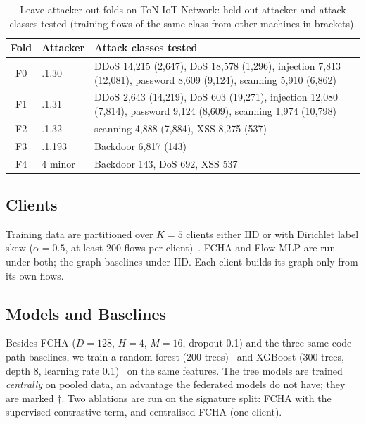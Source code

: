 \documentclass[journal]{IEEEtran}
\begin{document}
\begin{table}[t]
\centering
\caption{Leave-attacker-out folds on ToN-IoT-Network: held-out attacker and attack classes tested (training flows of the same class from other machines in brackets).}
\label{tab:attackerfolds}
\setlength{\tabcolsep}{3pt}
\footnotesize
\begin{tabular}{@{}cl p{5.0cm}@{}}
\toprule
Fold & Attacker & Attack classes tested \\
\midrule
F0 & .1.30 & DDoS 14{,}215 (2{,}647), DoS 18{,}578 (1{,}296), injection 7{,}813 (12{,}081), password 8{,}609 (9{,}124), scanning 5{,}910 (6{,}862)\\
F1 & .1.31 & DDoS 2{,}643 (14{,}219), DoS 603 (19{,}271), injection 12{,}080 (7{,}814), password 9{,}124 (8{,}609), scanning 1{,}974 (10{,}798)\\
F2 & .1.32 & scanning 4{,}888 (7{,}884), XSS 8{,}275 (537)\\
F3 & .1.193 & Backdoor 6{,}817 (143)\\
F4 & 4 minor & Backdoor 143, DoS 692, XSS 537\\
\bottomrule
\end{tabular}
\end{table}

\subsection{Clients}
Training data are partitioned over $K=5$ clients either IID or with Dirichlet label skew ($\alpha=0.5$, at least 200 flows per client)~\cite{hsu2019noniid}. FCHA and Flow-MLP are run under both; the graph baselines under IID. Each client builds its graph only from its own flows.

\subsection{Models and Baselines}
Besides FCHA ($D=128$, $H=4$, $M=16$, dropout 0.1) and the three same-code-path baselines, we train a random forest (200 trees)~\cite{breiman2001rf} and XGBoost (300 trees, depth 8, learning rate 0.1)~\cite{chen2016xgboost} on the same features. The tree models are trained \emph{centrally} on pooled data, an advantage the federated models do not have; they are marked $\dagger$. Two ablations are run on the signature split: FCHA with the supervised contrastive term, and centralised FCHA (one client).
\end{document}
